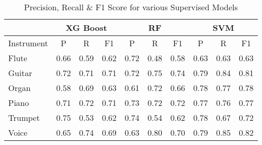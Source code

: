 \documentclass[conference]{IEEEtran}
\begin{document}
\begin{table}[h!]
			\resizebox{9cm}{!} {
			\begin{tabular}{@{}l|lll|lll|lll@{}}
				\toprule
				& \multicolumn{3}{c}{\textbf{XG Boost}}                                  & \multicolumn{3}{c}{\textbf{RF}}                                        & \multicolumn{3}{c}{\textbf{SVM}}                                       \\ \midrule
				Instrument & \multicolumn{1}{c}{P} & \multicolumn{1}{c}{R} & \multicolumn{1}{c}{F1} & \multicolumn{1}{c}{P} & \multicolumn{1}{c}{R} & \multicolumn{1}{c}{F1} & \multicolumn{1}{c}{P} & \multicolumn{1}{c}{R} & \multicolumn{1}{c}{F1} \\
				Flute      & 0.66                  & 0.59                  & 0.62                   & 0.72                  & 0.48                  & 0.58                   & 0.63                  & 0.63                  & 0.63                   \\
				Guitar      & 0.72                  & 0.71                  & 0.71                   & 0.72                  & 0.75                  & 0.74                   & 0.79                  & 0.84                  & 0.81                   \\
				Organ    & 0.58                  & 0.69                  & 0.63                   & 0.61                  & 0.72                  & 0.66                   & 0.78                  & 0.77                  & 0.78                   \\
				Piano     & 0.71                  & 0.72                  & 0.71                   & 0.73                  & 0.72                  & 0.72                   & 0.77                  & 0.76                  & 0.77                   \\
				Trumpet      & 0.75                  & 0.53                  & 0.62                   & 0.74                  & 0.54                  & 0.62                   & 0.78                  & 0.67                  & 0.72                   \\
				Voice      & 0.65                  & 0.74                  & 0.69                   & 0.63                  & 0.80                  & 0.70                   & 0.79                  & 0.85                  & 0.82                   \\ \bottomrule
			\end{tabular}}
			\vspace{0.1 in }
			\caption{Precision, Recall \& F1 Score for  various Supervised Models}
			\label{tab:res}
		\end{table}
\end{document}
